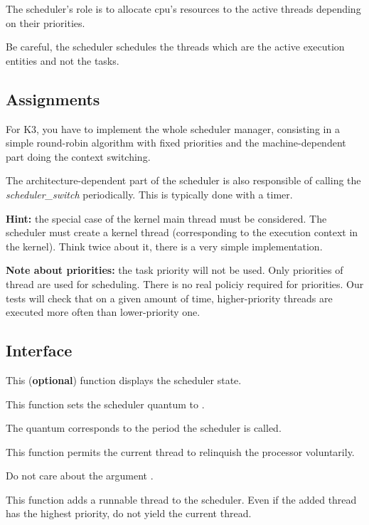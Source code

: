 The scheduler's role is to allocate cpu's resources to the
active threads depending on their priorities.

Be careful, the scheduler schedules the threads which are the active
execution entities and not the tasks.

\subsection*{Assignments}

For K3, you have to implement the whole scheduler manager, consisting
in a simple round-robin algorithm with fixed priorities and the
machine-dependent part doing the context switching.

The architecture-dependent part of the scheduler is also
responsible of calling the \emph{scheduler\_switch} periodically. This
is typically done with a timer.

\textbf{Hint:} the special case of the kernel main thread must be
considered. The scheduler must create a kernel thread
(corresponding to the execution context in the kernel). Think
twice about it, there is a very simple implementation.

\textbf{Note about priorities:} the task priority will not be
used. Only priorities of thread are used for scheduling. There is
no real policiy required for priorities. Our tests will check that
on a given amount of time, higher-priority threads are executed
more often than lower-priority one.

\subsection*{Interface}

{
  This (\textbf{optional}) function displays the scheduler state.
}

{
  This function sets the scheduler quantum to .

  The quantum corresponds to the period the scheduler is called.
}

{
  This function permits the current thread to relinquish
  the processor voluntarily.

  Do not care about the argument .
}

{
  This function adds a runnable thread to the scheduler. Even
  if the added thread has the highest priority, do not yield
  the current thread.
}

